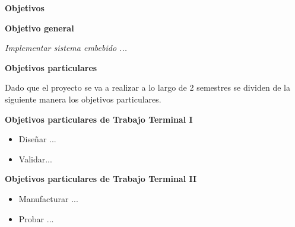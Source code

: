 
\textbf{{\Huge Objetivos}}


\textbf{{\LARGE Objetivo general}}
\label{Objetivo general}

\begin{center}
	\textit{Implementar sistema embebido ...}
\end{center}

\textbf{{\LARGE Objetivos particulares}}
\label{Objetivos part}

Dado que el proyecto se va a realizar a lo largo de 2 semestres se dividen de la siguiente manera los objetivos particulares.

\textbf{{\large Objetivos particulares de Trabajo Terminal I}}

\begin{itemize}
	\item Diseñar ...
	\item Validar...
\end{itemize}

\textbf{{\large Objetivos particulares de Trabajo Terminal II}}

\begin{itemize}
	\item Manufacturar ...
	\item Probar ...
\end{itemize}
\newpage

